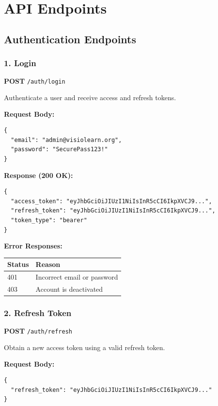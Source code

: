 \documentclass[12pt,a4paper,oneside]{article}
\begin{document}
\section{API Endpoints}

\subsection{Authentication Endpoints}

\subsubsection{1. Login}

\textbf{POST} \texttt{/auth/login}

Authenticate a user and receive access and refresh tokens.

\textbf{Request Body:}
\begin{lstlisting}
{
  "email": "admin@visiolearn.org",
  "password": "SecurePass123!"
}
\end{lstlisting}

\textbf{Response (200 OK):}
\begin{lstlisting}
{
  "access_token": "eyJhbGciOiJIUzI1NiIsInR5cCI6IkpXVCJ9...",
  "refresh_token": "eyJhbGciOiJIUzI1NiIsInR5cCI6IkpXVCJ9...",
  "token_type": "bearer"
}
\end{lstlisting}

\textbf{Error Responses:}
\begin{table}[H]
\centering
\begin{tabular}{|l|l|}
\hline
\textbf{Status} & \textbf{Reason} \\
\hline
401 & Incorrect email or password \\
403 & Account is deactivated \\
\hline
\end{tabular}
\end{table}

\subsubsection{2. Refresh Token}

\textbf{POST} \texttt{/auth/refresh}

Obtain a new access token using a valid refresh token.

\textbf{Request Body:}
\begin{lstlisting}
{
  "refresh_token": "eyJhbGciOiJIUzI1NiIsInR5cCI6IkpXVCJ9..."
}
\end{lstlisting}
\end{document}
